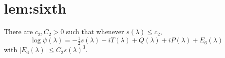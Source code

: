 \chapter{lem:sixth}\label{chap:lem_sixth}
\begin{lemma}\label{lem:sixth}
\leanok
There are $c_2,C_2>0$ such that whenever $s(\lambda)\le c_2$,
\[
  \log\psi(\lambda)
  =-\tfrac12 s(\lambda)-iT(\lambda)+Q(\lambda)+iP(\lambda)+E_6(\lambda)
\]
with $|E_6(\lambda)|\le C_2 s(\lambda)^3$.
\end{lemma}
